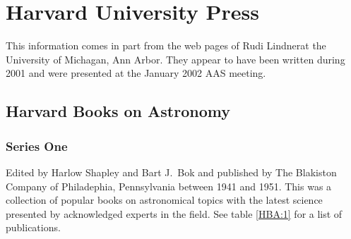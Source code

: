
\section{Harvard University Press}

This information comes in part from the web pages of Rudi
Lindner\footnotemark at the University of Michagan, Ann Arbor. They
appear to have been written during 2001 and were presented at the
January 2002 AAS meeting.


\subsection{Harvard Books on Astronomy}
\subsubsection{Series One}

Edited by Harlow Shapley and Bart J.\ Bok and published by The
Blakiston Company of Philadephia, Pennsylvania between 1941 and 1951.
This was a collection of popular books on astronomical topics with the
latest science presented by acknowledged experts in the field. See
table \ref{HBA:1} for a list of publications.

